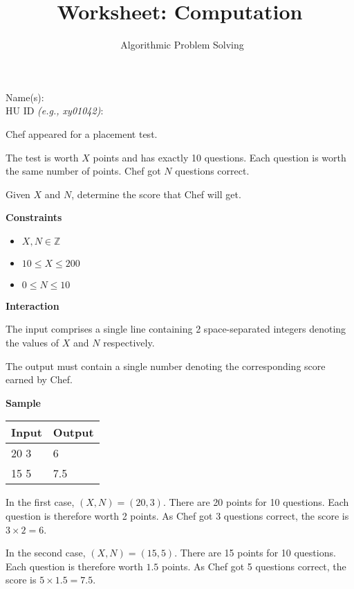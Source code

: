 \documentclass[a4paper]{exam}
\title{Worksheet: Computation}
\author{\class\ Algorithmic Problem Solving}
\date{\term}
\newcommand\heading[1]{\textbf{#1}}
\begin{document}
\maketitle

Name(s): \hrulefill\\[5pt]
HU ID \textit{\small(e.g., xy01042)}: \hrulefill\\

\begin{questions}


    Chef appeared for a placement test.

    The test is worth $X$ points and has exactly 10 questions. Each question is worth the same number of points. Chef got $N$ questions correct.

    Given $X$ and $N$, determine the score that Chef will get.

    \heading{Constraints}
    \begin{itemize}
        \item $X,N \in \mathbb{Z}$
        \item $ 10 \leq X \leq 200 $
        \item $ 0 \leq N \leq 10 $
    \end{itemize}

    \heading{Interaction}

    The input comprises a single line containing 2 space-separated integers denoting the values of $X$ and $N$ respectively.

    The output must contain a single number denoting the corresponding score earned by Chef.

    \heading{Sample}

    \begin{tabularx}{\textwidth}{|X|X|}
        \rowcolor{gray!50}
        \hline
        Input & Output \\ \hline\hline
        20 3  & 6      \\\hline
        15 5  & 7.5    \\\hline
    \end{tabularx}

    In the first case, $(X,N)=(20,3)$. There are 20 points for 10 questions. Each question is therefore worth 2 points. As Chef got 3 questions correct, the score is $3\times 2 = 6$.

    In the second case, $(X,N)=(15,5)$. There are 15 points for 10 questions. Each question is therefore worth $1.5$ points. As Chef got 5 questions correct, the score is $5\times 1.5 = 7.5$.


\end{questions}
\end{document}
